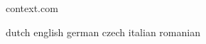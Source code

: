



\startlogginginterface context.com



\startcommands                    dutch                            english
                                  german                           czech
                                  italian                          romanian

